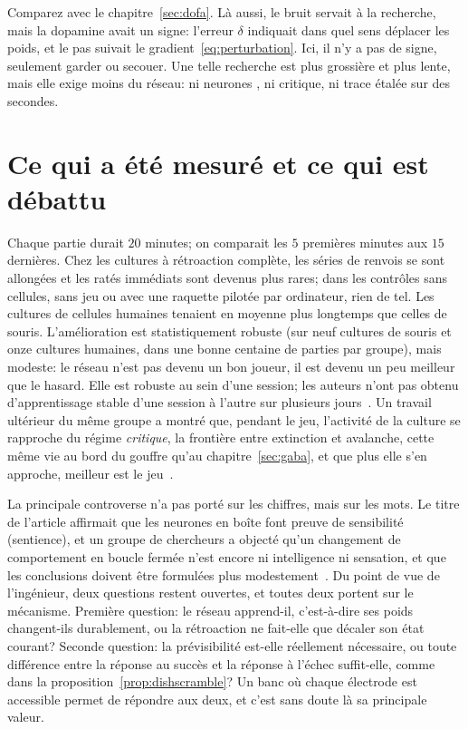 Comparez avec le chapitre~\ref{sec:dofa}. Là aussi, le bruit servait à la recherche, mais la dopamine avait un signe: l'erreur $\delta$ indiquait dans quel sens déplacer les poids, et le pas suivait le gradient~\eqref{eq:perturbation}. Ici, il n'y a pas de signe, seulement \og garder\fg{} ou \og secouer\fg{}. Une telle recherche est plus grossière et plus lente, mais elle exige moins du réseau: ni neurones , ni critique, ni trace étalée sur des secondes.

\section{Ce qui a été mesuré et ce qui est débattu}

Chaque partie durait $20$ minutes; on comparait les $5$ premières minutes aux $15$ dernières. Chez les cultures à rétroaction complète, les séries de renvois se sont allongées et les ratés immédiats sont devenus plus rares; dans les contrôles sans cellules, sans jeu ou avec une \og raquette\fg{} pilotée par ordinateur, rien de tel. Les cultures de cellules humaines tenaient en moyenne plus longtemps que celles de souris. L'amélioration est statistiquement robuste (sur neuf cultures de souris et onze cultures humaines, dans une bonne centaine de parties par groupe), mais modeste: le réseau n'est pas devenu un bon joueur, il est devenu un peu meilleur que le hasard. Elle est robuste au sein d'une session; les auteurs n'ont pas obtenu d'apprentissage stable d'une session à l'autre sur plusieurs jours~\cite{Kagan2022}. Un travail ultérieur du même groupe a montré que, pendant le jeu, l'activité de la culture se rapproche du régime \emph{critique}, la frontière entre extinction et avalanche, cette même vie au bord du gouffre qu'au chapitre~\ref{sec:gaba}, et que plus elle s'en approche, meilleur est le jeu~\cite{Habibollahi2023}.

La principale controverse n'a pas porté sur les chiffres, mais sur les mots. Le titre de l'article affirmait que les neurones en boîte \og font preuve de sensibilité\fg{} (sentience), et un groupe de chercheurs a objecté qu'un changement de comportement en boucle fermée n'est encore ni intelligence ni sensation, et que les conclusions doivent être formulées plus modestement~\cite{Balci2023}. Du point de vue de l'ingénieur, deux questions restent ouvertes, et toutes deux portent sur le mécanisme. Première question: le réseau apprend-il, c'est-à-dire ses poids changent-ils durablement, ou la rétroaction ne fait-elle que décaler son état courant? Seconde question: la prévisibilité est-elle réellement nécessaire, ou toute différence entre la réponse au succès et la réponse à l'échec suffit-elle, comme dans la proposition~\ref{prop:dishscramble}? Un banc où chaque électrode est accessible permet de répondre aux deux, et c'est sans doute là sa principale valeur.

